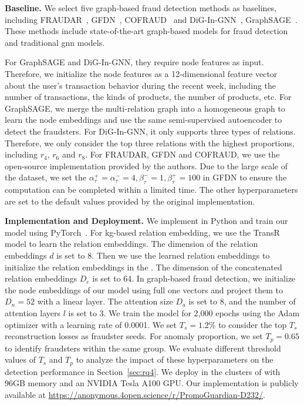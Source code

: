 \noindent \textbf{Baseline.} We select five graph-based fraud detection methods as baselines, including FRAUDAR~\cite{hooi2016fraudar}, GFDN~\cite{yu2023group}, COFRAUD~\cite{zang2023don} and DiG-In-GNN~\cite{zhang2024dig}, GraphSAGE~\cite{10.5555/3294771.3294869}. These methods include state-of-the-art graph-based models for fraud detection and traditional \ac{gnn} models.

For GraphSAGE and DiG-In-GNN, they require node features as input. Therefore, we initialize the node features as a 12-dimensional feature vector about the user's transaction behavior during the recent week, including the number of transactions, the kinds of products, the number of products, etc. 
For GraphSAGE, we merge the multi-relation graph into a homogeneous graph to learn the node embeddings and use the same semi-supervised autoencoder to detect the fraudsters. For DiG-In-GNN, it only supports three types of relations. Therefore, we only consider the top three relations with the highest proportions, including $r_4$, $r_6$ and $r_8$. For FRAUDAR, GFDN and COFRAUD, we use the open-source implementation provided by the authors. Due to the large scale of the dataset, we set the $\alpha_{\tau}^{+} = \alpha_{\tau}^{-} = 4, \beta_{\tau}^{-} = 1, \beta_{\tau}^{+} = 100$ in GFDN to ensure the computation can be completed within a limited time. The other hyperparameters are set to the default values provided by the original implementation. 

\noindent \textbf{Implementation and Deployment.} We implement \toolname in Python and train our model using PyTorch~\cite{paszke2019pytorch}. For \ac{kg}-based relation embedding, we use the TransR model to learn the relation embeddings. The dimension of the relation embeddings $d$ is set to 8. Then we use the learned relation embeddings to initialize the relation embeddings in the \toolname. The dimension of the concatenated relation embeddings $D_{e}$ is set to 64. In graph-based fraud detection, we initialize the node embeddings of our model using full one vectors and project them to $D_{n} = 52$ with a linear layer. The attention size $D_{a}$ is set to 8, and the number of attention layers $l$ is set to 3. We train the model for 2,000 epochs using the Adam optimizer with a learning rate of 0.0001. 
We set $T_s = 1.2\%$ to consider the top $T_{s}$ reconstruction losses as fraudster seeds. For anomaly proportion, we set $T_p = 0.65$ to identify fraudsters within the same group. We evaluate different threshold values of $T_s$ and $T_p$ to analyze the impact of these hyperparameters on the detection performance in Section~\ref{sec:rq4}. We deploy \toolname in the clusters of \Company with 96GB memory and an NVIDIA Tesla A100 GPU.
Our implementation is publicly available at \url{https://anonymous.4open.science/r/PromoGuardian-D232/}.

